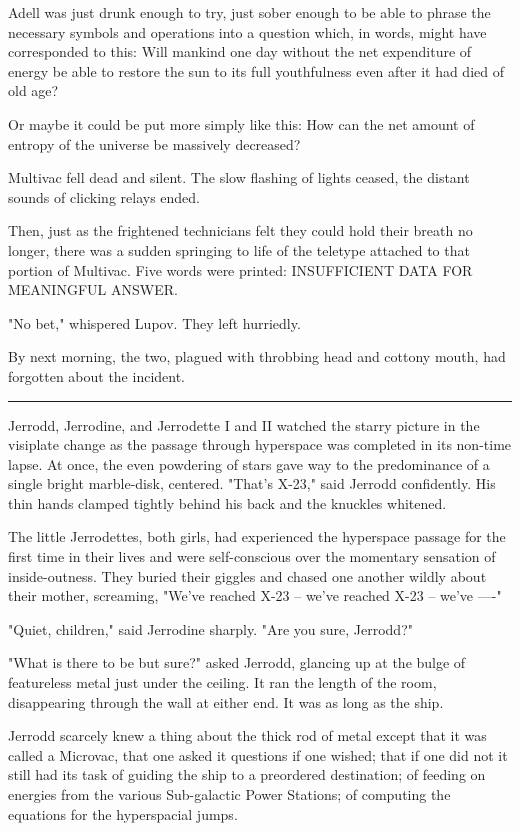 \documentclass[11pt]{article}
\newcommand{\sep}[0]{\vspace{.5cm}\hrule\vspace{.5cm}}
\begin{document}
Adell was just drunk enough to try, just sober enough to be able to phrase the necessary symbols and operations into a question which, in words, might have corresponded to this: Will mankind one day without the net expenditure of energy be able to restore the sun to its full youthfulness even after it had died of old age?

Or maybe it could be put more simply like this: How can the net amount of entropy of the universe be massively decreased?

Multivac fell dead and silent. The slow flashing of lights ceased, the distant sounds of clicking relays ended.

Then, just as the frightened technicians felt they could hold their breath no longer, there was a sudden springing to life of the teletype attached to that portion of Multivac. Five words were printed: 
\textsc{INSUFFICIENT DATA FOR MEANINGFUL ANSWER.}

"No bet," whispered Lupov. They left hurriedly.

By next morning, the two, plagued with throbbing head and cottony mouth, had forgotten about the incident.

\sep{}

Jerrodd, Jerrodine, and Jerrodette I and II watched the starry picture in the visiplate change as the passage through hyperspace was completed in its non-time lapse. At once, the even powdering of stars gave way to the predominance of a single bright marble-disk, centered.
"That's X-23," said Jerrodd confidently. His thin hands clamped tightly behind his back and the knuckles whitened.

The little Jerrodettes, both girls, had experienced the hyperspace passage for the first time in their lives and were self-conscious over the momentary sensation of inside-outness. They buried their giggles and chased one another wildly about their mother, screaming, "We've reached X-23 -- we've reached X-23 -- we've ----"

"Quiet, children," said Jerrodine sharply. "Are you sure, Jerrodd?"

"What is there to be but sure?" asked Jerrodd, glancing up at the bulge of featureless metal just under the ceiling. It ran the length of the room, disappearing through the wall at either end. It was as long as the ship.

Jerrodd scarcely knew a thing about the thick rod of metal except that it was called a Microvac, that one asked it questions if one wished; that if one did not it still had its task of guiding the ship to a preordered destination; of feeding on energies from the various Sub-galactic Power Stations; of computing the equations for the hyperspacial jumps.
\end{document}
